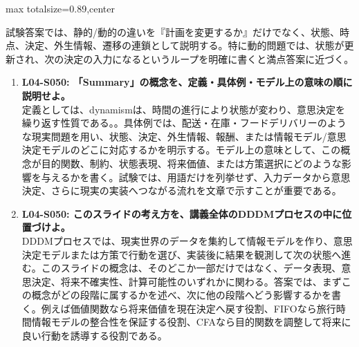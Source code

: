 \begin{minipage}[t]{0.58\textwidth}
\begin{adjustbox}{max totalsize={\textwidth}{0.89\textheight},center}
\begin{minipage}{\textwidth}
試験答案では、静的/動的の違いを『計画を変更するか』だけでなく、状態、時点、決定、外生情報、遷移の連鎖として説明する。特に動的問題では、状態が更新され、次の決定の入力になるというループを明確に書くと満点答案に近づく。\par{}\begin{enumerate}\item \textbf{L04-S050: 「Summary」の概念を、定義・具体例・モデル上の意味の順に説明せよ。}\\定義としては、dynamismは、時間の進行により状態が変わり、意思決定を繰り返す性質である。。具体例では、配送・在庫・フードデリバリーのような現実問題を用い、状態、決定、外生情報、報酬、または情報モデル/意思決定モデルのどこに対応するかを明示する。モデル上の意味として、この概念が目的関数、制約、状態表現、将来価値、または方策選択にどのような影響を与えるかを書く。試験では、用語だけを列挙せず、入力データから意思決定、さらに現実の実装へつながる流れを文章で示すことが重要である。\item \textbf{L04-S050: このスライドの考え方を、講義全体のDDDMプロセスの中に位置づけよ。}\\DDDMプロセスでは、現実世界のデータを集約して情報モデルを作り、意思決定モデルまたは方策で行動を選び、実装後に結果を観測して次の状態へ進む。このスライドの概念は、そのどこか一部だけではなく、データ表現、意思決定、将来不確実性、計算可能性のいずれかに関わる。答案では、まずこの概念がどの段階に属するかを述べ、次に他の段階へどう影響するかを書く。例えば価値関数なら将来価値を現在決定へ戻す役割、FIFOなら旅行時間情報モデルの整合性を保証する役割、CFAなら目的関数を調整して将来に良い行動を誘導する役割である。\end{enumerate}
\end{minipage}
\end{adjustbox}
\end{minipage}


